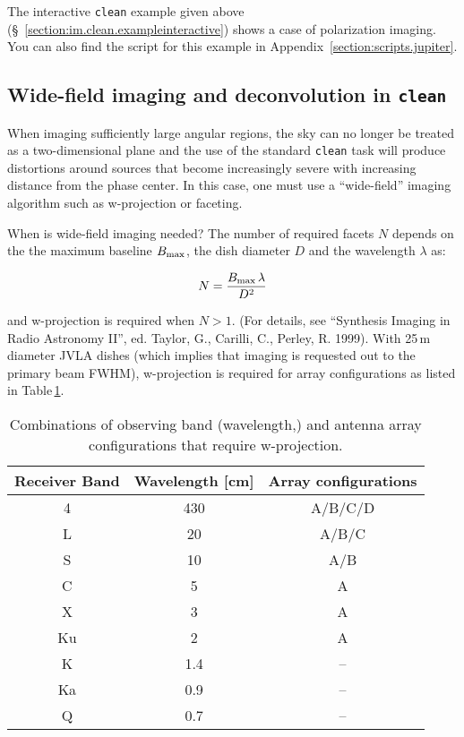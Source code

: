The interactive {\tt clean} example given above 
(\S~\ref{section:im.clean.exampleinteractive}) shows
a case of polarization imaging.  You can also find the script for
this example in Appendix~\ref{section:scripts.jupiter}.

\subsection{Wide-field imaging and deconvolution in {\tt clean}}
\label{section:im.clean.widefield}

When imaging sufficiently large angular regions, the sky can no longer
be treated as a two-dimensional plane and the use of the standard {\tt clean}
task will produce distortions around sources that become
increasingly severe with increasing distance from the phase center.
In this case, one must use a ``wide-field'' imaging algorithm such as
w-projection or faceting.

When is wide-field imaging needed? The number of required facets $N$ depends on
the the maximum baseline $B_{\rm max}$, the dish diameter $D$ and the
wavelength $\lambda$ as:

\begin{equation}
N=\frac{B_{\rm max}\,\lambda}{D^{2}}
\label{eq:imaging.wproj.facets}
\end{equation} 

and w-projection is required when $N>1$. (For details, see ``Synthesis
Imaging in Radio Astronomy II'', ed. Taylor, G., Carilli, C., Perley,
R. 1999). With 25\,m diameter JVLA dishes (which implies that imaging
is requested out to the primary beam FWHM), w-projection is required
for array configurations as listed in
Table\,\ref{tab:imaging.w-projection.config}.

\begin{table}
\begin{tabular}{ccc}
\hline
Receiver Band & Wavelength [cm] & Array configurations \\
\hline
4             &  430            &  A/B/C/D \\
L             &  20             &  A/B/C \\
S             &  10             &  A/B \\
C             &  5              &  A \\
X             &  3              &  A \\
Ku            &  2              &  A \\
K             &  1.4            &  -- \\
Ka            &  0.9            &  -- \\
Q             &  0.7            &  -- \\
\hline
\end{tabular}
\caption{Combinations of observing band (wavelength,) and antenna
  array configurations that require w-projection. \label{tab:imaging.w-projection.config}}
\end{table}



